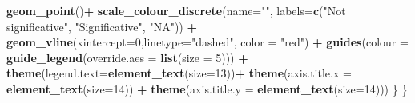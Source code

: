 \documentclass[
  12pt,
]{article}
\newenvironment{Shaded}{\begin{snugshade}}{\end{snugshade}}
\newcommand{\DataTypeTok}[1]{\textcolor[rgb]{0.13,0.29,0.53}{#1}}
\newcommand{\DecValTok}[1]{\textcolor[rgb]{0.00,0.00,0.81}{#1}}
\newcommand{\KeywordTok}[1]{\textcolor[rgb]{0.13,0.29,0.53}{\textbf{#1}}}
\newcommand{\NormalTok}[1]{#1}
\newcommand{\OperatorTok}[1]{\textcolor[rgb]{0.81,0.36,0.00}{\textbf{#1}}}
\newcommand{\StringTok}[1]{\textcolor[rgb]{0.31,0.60,0.02}{#1}}
\begin{document}
\begin{Shaded}
\begin{Highlighting}[]
{{{\StringTok{             }\KeywordTok{geom_point}\NormalTok{()}\OperatorTok{+}
\StringTok{             }\KeywordTok{scale_colour_discrete}\NormalTok{(}\DataTypeTok{name=}\StringTok{""}\NormalTok{,}
                                   \DataTypeTok{labels=}\KeywordTok{c}\NormalTok{(}\StringTok{"Not significative"}\NormalTok{, }\StringTok{"Significative"}\NormalTok{, }\StringTok{"NA"}\NormalTok{)) }\OperatorTok{+}
\StringTok{             }\KeywordTok{geom_vline}\NormalTok{(}\DataTypeTok{xintercept=}\DecValTok{0}\NormalTok{,}\DataTypeTok{linetype=}\StringTok{"dashed"}\NormalTok{, }\DataTypeTok{color =} \StringTok{"red"}\NormalTok{) }\OperatorTok{+}
\StringTok{             }\KeywordTok{guides}\NormalTok{(}\DataTypeTok{colour =} \KeywordTok{guide_legend}\NormalTok{(}\DataTypeTok{override.aes =} \KeywordTok{list}\NormalTok{(}\DataTypeTok{size =} \DecValTok{5}\NormalTok{))) }\OperatorTok{+}
\StringTok{             }\KeywordTok{theme}\NormalTok{(}\DataTypeTok{legend.text=}\KeywordTok{element_text}\NormalTok{(}\DataTypeTok{size=}\DecValTok{13}\NormalTok{))}\OperatorTok{+}
\StringTok{             }\KeywordTok{theme}\NormalTok{(}\DataTypeTok{axis.title.x =} \KeywordTok{element_text}\NormalTok{(}\DataTypeTok{size=}\DecValTok{14}\NormalTok{)) }\OperatorTok{+}
\StringTok{             }\KeywordTok{theme}\NormalTok{(}\DataTypeTok{axis.title.y =} \KeywordTok{element_text}\NormalTok{(}\DataTypeTok{size=}\DecValTok{14}\NormalTok{))) }
\NormalTok{  \}}
\NormalTok{\}}

}}}
\end{Highlighting}
\end{Shaded}
\end{document}
